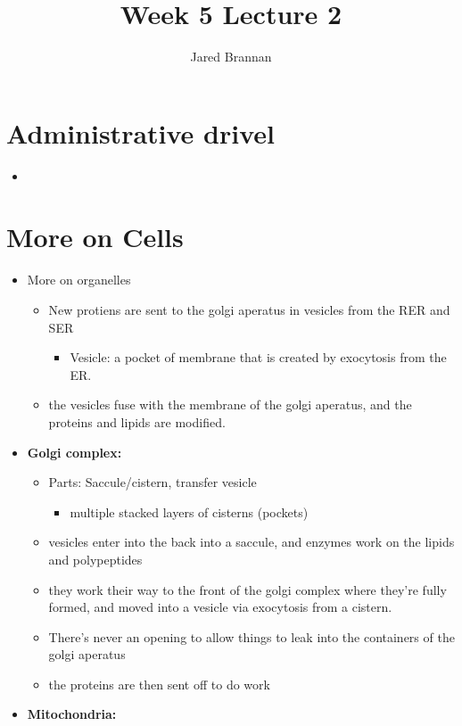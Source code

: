 \documentclass{article}
\title{Week 5 Lecture 2}
\author{Jared Brannan }
\theoremstyle{definition}
\begin{document}
\maketitle

\section{Administrative drivel}
\begin{itemize}
	\item
\end{itemize}

\section{More on Cells}
\begin{itemize}
	\item More on organelles
		\begin{itemize}
			\item New protiens are sent to the golgi aperatus in vesicles from the RER and SER
				\begin{itemize}
					\item Vesicle: a pocket of membrane that is created by exocytosis from the ER.
				\end{itemize}
			\item the vesicles fuse with the membrane of the golgi aperatus, and the proteins and lipids are modified.
		\end{itemize}
	\item \textbf{Golgi complex:}
		\begin{itemize}
			\item Parts: Saccule/cistern, transfer vesicle
				\begin{itemize}
					\item multiple stacked layers of cisterns (pockets)
				\end{itemize}
			\item vesicles enter into the back into a saccule, and enzymes work on the lipids and polypeptides
			\item they work their way to the front of the golgi complex where they're fully formed, and moved into a vesicle via exocytosis from a cistern.
			\item There's never an opening to allow things to leak into the containers of the golgi aperatus
			\item the proteins are then sent off to do work
		\end{itemize}
	\item \textbf{Mitochondria:}

\end{itemize}
\end{document}
